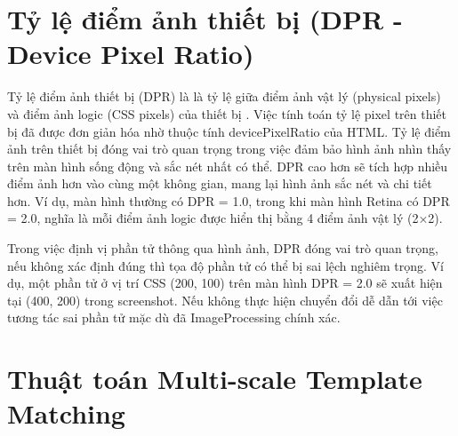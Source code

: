 \documentclass[a4paper, 12pt]{report}
\begin{document}
\section{Tỷ lệ điểm ảnh thiết bị (DPR - Device Pixel Ratio)}

Tỷ lệ điểm ảnh thiết bị (DPR) là là tỷ lệ giữa điểm ảnh vật lý (physical pixels) và điểm ảnh logic (CSS pixels) của thiết bị \cite{mdnDevicePixelRatio}. Việc tính toán tỷ lệ pixel trên thiết bị đã được đơn giản hóa nhờ thuộc tính devicePixelRatio của HTML. Tỷ lệ điểm ảnh trên thiết bị đóng vai trò quan trọng trong việc đảm bảo hình ảnh nhìn thấy trên màn hình sống động và sắc nét nhất có thể. DPR cao hơn sẽ tích hợp nhiều điểm ảnh hơn vào cùng một không gian, mang lại hình ảnh sắc nét và chi tiết hơn. Ví dụ, màn hình thường có DPR = 1.0, trong khi màn hình Retina có DPR = 2.0, nghĩa là mỗi điểm ảnh logic được hiển thị bằng 4 điểm ảnh vật lý (2×2).


Trong việc định vị phần tử thông qua hình ảnh, DPR đóng vai trò quan trọng, nếu không xác định đúng thì tọa độ phần tử có thể bị sai lệch nghiêm trọng. Ví dụ, một phần tử ở vị trí CSS (200, 100) trên màn hình DPR = 2.0 sẽ xuất hiện tại (400, 200) trong screenshot. Nếu không thực hiện chuyển đổi dễ dẫn tới việc tương tác sai phần tử mặc dù đã \gls{ImageProcessing} chính xác.



\section{Thuật toán Multi-scale Template Matching}

\end{document}
